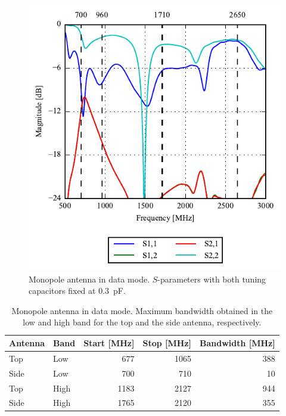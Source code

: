 \begin{figure}[htbp]
    \centering
    \includegraphics{img/tech_sol/monopole/data_mode/sparam_data.pdf}
    \caption{Monopole antenna in data mode. $S$-parameters with both tuning capacitors fixed at \SI{0.3}{pF}.}
    \label{fig:mono_sparam_data}
\end{figure}

\begin{table}[htbp]
  \centering
  \begin{tabular}{|l|l|r|r|r|}
    \hline
    Antenna & Band & Start [MHz] & Stop [MHz] & Bandwidth [MHz] \\
    \hline
    Top     & Low  &  677  & 1065  & 388 \\
    Side    & Low  &  700  & 710  & 10  \\
    \hline
    Top     & High &  1183 &  2127  & 944 \\
    Side    & High & 1765 &  2120 & 355 \\
    \hline
  \end{tabular}
  \caption{Monopole antenna in data mode. Maximum bandwidth obtained in the low and high band for the top and the side antenna, respectively.}    
  \label{tab:bw_sol1data}
\end{table}

